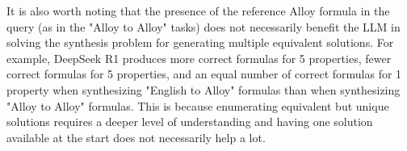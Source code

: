 It is also worth noting that the presence of the reference Alloy formula in the query (as in the "Alloy to Alloy" tasks) does not necessarily benefit the LLM in solving the synthesis problem for generating multiple equivalent solutions.  For example, DeepSeek R1 produces more correct formulas for 5 properties, fewer correct formulas for 5 properties, and an equal number of correct formulas for 1 property when synthesizing "English to Alloy" formulas than when synthesizing "Alloy to Alloy" formulas.  This is because enumerating equivalent but unique solutions requires a deeper level of understanding and having one solution available at the start does not necessarily help a lot.
